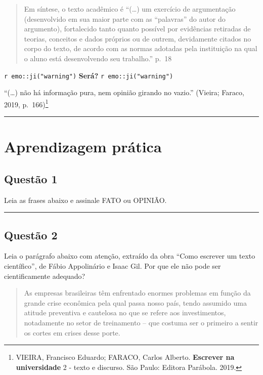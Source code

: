 \documentclass[
  letterpaper,
  DIV=11,
  numbers=noendperiod]{scrreprt}
\begin{document}
\begin{quote}
Em síntese, o texto acadêmico é ``(\ldots) um exercício de argumentação
(desenvolvido em sua maior parte com as ``palavras'' do autor do
argumento), fortalecido tanto quanto possível por evidências retiradas
de teorias, conceitos e dados próprios ou de outrem, devidamente citados
no corpo do texto, de acordo com as normas adotadas pela instituição na
qual o aluno está desenvolvendo seu trabalho.'' p.~18
\end{quote}

\texttt{r\ emo::ji("warning")} \textbf{Será?}
\texttt{r\ emo::ji("warning")}

``(\ldots) não há informação pura, nem opinião girando no vazio.''
(Vieira; Faraco, 2019, p.~166)\footnote{VIEIRA, Francisco Eduardo;
  FARACO, Carlos Alberto. \textbf{Escrever na universidade} 2 - texto e
  discurso. São Paulo: Editora Parábola. 2019.}

\begin{center}\rule{0.5\linewidth}{0.5pt}\end{center}

\section{Aprendizagem prática}\label{aprendizagem-pruxe1tica-2}

\subsection{Questão 1}\label{questuxe3o-1-2}

Leia as frases abaixo e assinale FATO ou OPINIÃO.

\begin{center}\rule{0.5\linewidth}{0.5pt}\end{center}

\subsection{Questão 2}\label{questuxe3o-2-1}

Leia o parágrafo abaixo com atenção, extraído da obra ``Como escrever um
texto científico'', de Fábio Appolinário e Isaac Gil. Por que ele não
pode ser cientificamente adequado?

\begin{quote}
As empresas brasileiras têm enfrentado enormes problemas em função da
grande crise econômica pela qual passa nosso país, tendo assumido uma
atitude preventiva e cautelosa no que se refere aos investimentos,
notadamente no setor de treinamento -- que costuma ser o primeiro a
sentir os cortes em crises desse porte.
\end{quote}
\end{document}
